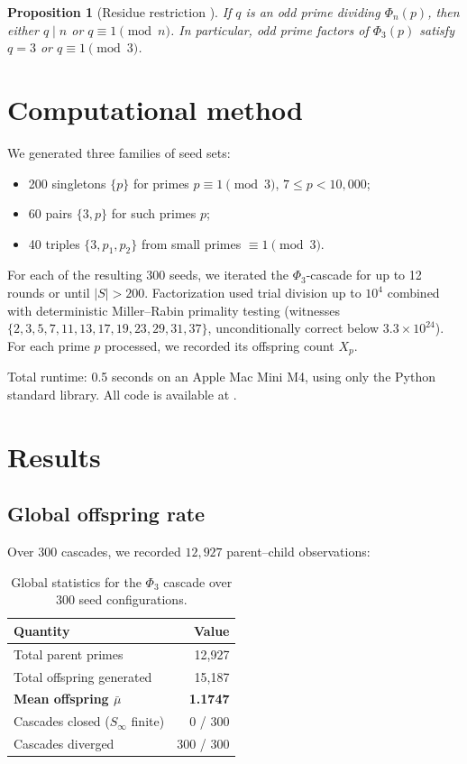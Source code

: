 \documentclass[11pt]{article}
\newtheorem{proposition}[theorem]{Proposition}
\theoremstyle{definition}
\theoremstyle{remark}
\newcommand{\Phi}{\varPhi}
\begin{document}
\begin{proposition}[Residue restriction {\cite[Theorem~2]{Nielsen2007}}]\label{prop:residue}
If $q$ is an odd prime dividing $\Phi_n(p)$, then either $q \mid n$ or $q \equiv 1 \pmod{n}$. In particular, odd prime factors of $\Phi_3(p)$ satisfy $q = 3$ or $q \equiv 1 \pmod{3}$.
\end{proposition}

\section{Computational method}

We generated three families of seed sets:
\begin{itemize}
\item 200 singletons $\{p\}$ for primes $p \equiv 1 \pmod{3}$, $7 \leq p < 10{,}000$;
\item 60 pairs $\{3, p\}$ for such primes $p$;
\item 40 triples $\{3, p_1, p_2\}$ from small primes $\equiv 1 \pmod{3}$.
\end{itemize}
For each of the resulting 300 seeds, we iterated the $\Phi_3$-cascade for up to 12 rounds or until $|S| > 200$. Factorization used trial division up to $10^4$ combined with deterministic Miller--Rabin primality testing (witnesses $\{2, 3, 5, 7, 11, 13, 17, 19, 23, 29, 31, 37\}$, unconditionally correct below $3.3 \times 10^{24}$). For each prime $p$ processed, we recorded its offspring count $X_p$.

Total runtime: 0.5 seconds on an Apple Mac Mini M4, using only the Python standard library. All code is available at \cite{CodeRepo}.

\section{Results}

\subsection{Global offspring rate}

Over 300 cascades, we recorded $12{,}927$ parent--child observations:

\begin{table}[H]
\centering
\begin{tabular}{@{}lr@{}}
\toprule
\textbf{Quantity} & \textbf{Value} \\
\midrule
Total parent primes & 12,927 \\
Total offspring generated & 15,187 \\
\textbf{Mean offspring $\bar\mu$} & \textbf{1.1747} \\
Cascades closed ($S_\infty$ finite) & 0 / 300 \\
Cascades diverged & 300 / 300 \\
\bottomrule
\end{tabular}
\caption{Global statistics for the $\Phi_3$ cascade over 300 seed configurations.}
\label{tab:global}
\end{table}
\end{document}
